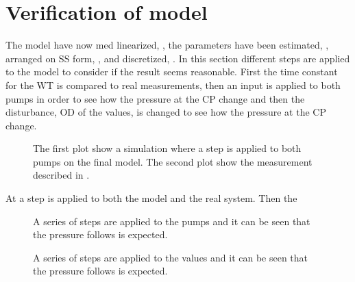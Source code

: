 \section{Verification of model}
\label{verification_of_model}

The model have now med linearized, , the parameters have been estimated, , arranged on SS form, , and discretized, . In this section different steps are applied to the model to consider if the result seems reasonable. First the time constant for the WT is compared to real measurements, then an input is applied to both pumps in order to see how the pressure at the CP change and then the disturbance, OD of the values, is changed to see how the pressure at the CP change. 

\begin{figure}[H]
   \centering
    
    \caption{The first plot show a simulation where a step is applied to both pumps on the final model. The second plot show the measurement described in .}
    \label{simulation_time_constant}
\end{figure}

At  a step is applied to both the model and the real system. Then the 


\begin{figure}[H]
   \centering
    
    \caption{A series of steps are applied to the pumps and it can be seen that the pressure follows is expected.}
    \label{input_simulation}
\end{figure}

\begin{figure}[H]
   \centering
    
    \caption{A series of steps are applied to the values and it can be seen that the pressure follows is expected.}
    \label{disturbance_simulation}
\end{figure}
